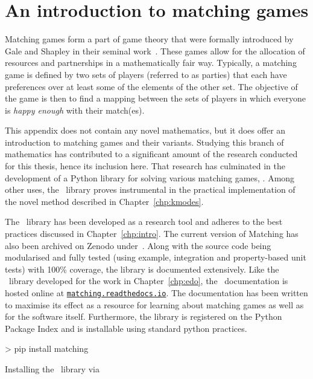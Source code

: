\chapter{An introduction to matching games}
\label{app:matching}

\graphicspath{{appendix/matching/paper/img/}}

Matching games form a part of game theory that were formally introduced by Gale
and Shapley in their seminal work~\cite{Gale1962}. These games allow for the
allocation of resources and partnerships in a mathematically fair way.
Typically, a matching game is defined by two sets of players (referred to as
parties) that each have preferences over at least some of the elements of the
other set.  The objective of the game is then to find a mapping between the sets
of players in which everyone is \emph{happy enough} with their match(es).

This appendix does not contain any novel mathematics, but it does offer an
introduction to matching games and their variants. Studying this branch of
mathematics has contributed to a significant amount of the research conducted
for this thesis, hence its inclusion here. That research has culminated in the
development of a Python library for solving various matching games, \matching.
Among other uses, the \matching\ library proves instrumental in the practical
implementation of the novel method described in Chapter~\ref{chp:kmodes}.

The \matching\ library has been developed as a research tool and adheres to the
best practices discussed in Chapter~\ref{chp:intro}. The current version of
Matching has also been archived on Zenodo under~.
Along with the source code being modularised and fully tested (using example,
integration and property-based unit tests) with 100\% coverage, the library is
documented extensively. Like the \edo\ library developed for the work in
Chapter~\ref{chp:edo}, the \matching\ documentation is hosted online at
\href{https://matching.readthedocs.io}{\nolinkurl{matching.readthedocs.io}}.
The documentation has been written to maximise its effect as a resource for
learning about matching games as well as for the software itself. Furthermore,
the library is registered on the Python Package Index and is installable using
standard python practices.

\begin{listing}
\begin{usagesh}
> pip install matching
\end{usagesh}
\caption{Installing the \matching\ library via \pip}
\end{listing}

